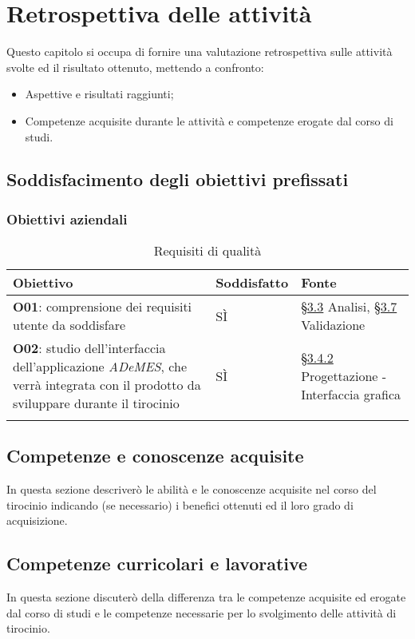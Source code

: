 \chapter{Retrospettiva delle attività}
\label{cap:resoconto}
Questo capitolo si occupa di fornire una valutazione retrospettiva sulle attività svolte ed il risultato ottenuto, mettendo a confronto:
\begin{itemize}
    \item Aspettive e risultati raggiunti;
    \item Competenze acquisite durante le attività e competenze erogate dal corso di studi.
\end{itemize}

\section{Soddisfacimento degli obiettivi prefissati}

\subsection*{Obiettivi aziendali}

\begin{longtable}{>{\centering\arraybackslash}m{}>{\centering\arraybackslash}m{}>{\centering\arraybackslash}m{}}
    \hline
    \rowcolor{black}
    \color{white}\textbf{Obiettivo} & \color{white}\textbf{Soddisfatto} & \color{white}\textbf{Fonte} \\
    \hline
    \endhead %
    \textbf{O01}: comprensione dei requisiti utente da soddisfare & SÌ & \hyperref[sec:analisi]{§3.3} Analisi, \hyperref[sec:validazione]{§3.7} Validazione \\
    \hline
    \textbf{O02}: studio dell’interfaccia dell’applicazione \textit{ADeMES}, che verrà integrata
    con il prodotto da sviluppare durante il tirocinio & SÌ & \hyperref[sec:analisi]{§3.4.2} Progettazione - Interfaccia grafica \\
    \hline
    \caption{Requisiti di qualità}
\end{longtable}

\section{Competenze e conoscenze acquisite}

In questa sezione descriverò le abilità e le conoscenze acquisite nel corso del tirocinio indicando (se necessario) i benefici ottenuti ed il loro grado di acquisizione.

\section{Competenze curricolari e lavorative}

In questa sezione discuterò della differenza tra le competenze acquisite ed erogate dal corso di studi e le competenze necessarie per lo svolgimento delle attività di tirocinio.
